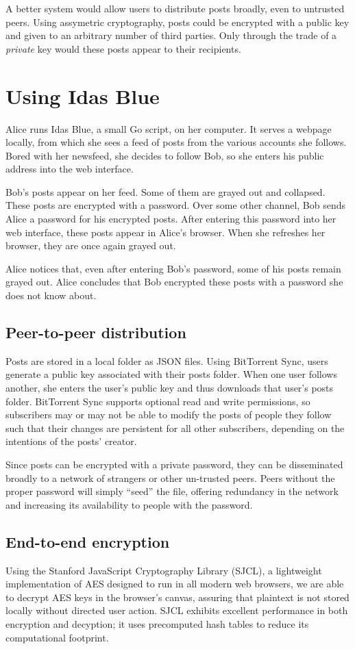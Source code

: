 \documentclass{article}
\begin{document}
A better system would allow users to distribute posts broadly, even to untrusted peers. Using assymetric cryptography, posts could be encrypted with a public key and given to an arbitrary number of third parties. Only through the trade of a \textit{private} key would these posts appear to their recipients.

\section{Using Idas Blue}
Alice runs Idas Blue, a small Go script, on her computer. It serves a webpage locally, from which she sees a feed of posts from the various accounts she follows. Bored with her newsfeed, she decides to follow Bob, so she enters his public address into the web interface. 

Bob's posts appear on her feed. Some of them are grayed out and collapsed. These posts are encrypted with a password. Over some other channel, Bob sends Alice a password for his encrypted posts. After entering this password into her web interface, these posts appear in Alice's browser. When she refreshes her browser, they are once again grayed out. 

Alice notices that, even after entering Bob's password, some of his posts remain grayed out. Alice concludes that Bob encrypted these posts with a password she does not know about.

\subsection{Peer-to-peer distribution}
Posts are stored in a local folder as JSON files. Using BitTorrent Sync, users generate a public key associated with their posts folder. When one user follows another, she enters the user's public key and thus downloads that user's posts folder. BitTorrent Sync supports optional read and write permissions, so subscribers may or may not be able to modify the posts of people they follow such that their changes are persistent for all other subscribers, depending on the intentions of the posts' creator.

Since posts can be encrypted with a private password, they can be disseminated broadly to a network of strangers or other un-trusted peers. Peers without the proper password will simply ``seed'' the file, offering redundancy in the network and increasing its availability to people with the password. 

\subsection{End-to-end encryption}
Using the Stanford JavaScript Cryptography Library (SJCL), a lightweight implementation of AES designed to run in all modern web browsers, we are able to decrypt AES keys in the browser's canvas, assuring that plaintext is not stored locally without directed user action. SJCL exhibits excellent performance in both encryption and decyption; it uses precomputed hash tables to reduce its computational footprint. \cite{stark09}
\end{document}

